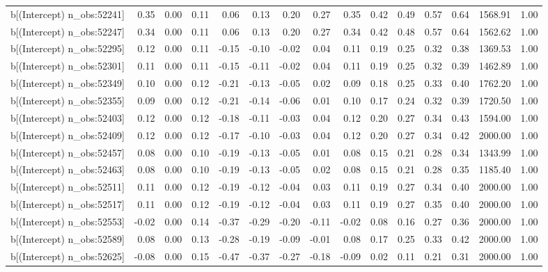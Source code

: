 \begin{table}[ht]
\begin{tabular}{rrrrrrrrrrrrrrr}
  b[(Intercept) n\_obs:52241] & 0.35 & 0.00 & 0.11 & 0.06 & 0.13 & 0.20 & 0.27 & 0.35 & 0.42 & 0.49 & 0.57 & 0.64 & 1568.91 & 1.00 \\ 
  b[(Intercept) n\_obs:52247] & 0.34 & 0.00 & 0.11 & 0.06 & 0.13 & 0.20 & 0.27 & 0.34 & 0.42 & 0.48 & 0.57 & 0.64 & 1562.62 & 1.00 \\ 
  b[(Intercept) n\_obs:52295] & 0.12 & 0.00 & 0.11 & -0.15 & -0.10 & -0.02 & 0.04 & 0.11 & 0.19 & 0.25 & 0.32 & 0.38 & 1369.53 & 1.00 \\ 
  b[(Intercept) n\_obs:52301] & 0.11 & 0.00 & 0.11 & -0.15 & -0.11 & -0.02 & 0.04 & 0.11 & 0.19 & 0.25 & 0.32 & 0.39 & 1462.89 & 1.00 \\ 
  b[(Intercept) n\_obs:52349] & 0.10 & 0.00 & 0.12 & -0.21 & -0.13 & -0.05 & 0.02 & 0.09 & 0.18 & 0.25 & 0.33 & 0.40 & 1762.20 & 1.00 \\ 
  b[(Intercept) n\_obs:52355] & 0.09 & 0.00 & 0.12 & -0.21 & -0.14 & -0.06 & 0.01 & 0.10 & 0.17 & 0.24 & 0.32 & 0.39 & 1720.50 & 1.00 \\ 
  b[(Intercept) n\_obs:52403] & 0.12 & 0.00 & 0.12 & -0.18 & -0.11 & -0.03 & 0.04 & 0.12 & 0.20 & 0.27 & 0.34 & 0.43 & 1594.00 & 1.00 \\ 
  b[(Intercept) n\_obs:52409] & 0.12 & 0.00 & 0.12 & -0.17 & -0.10 & -0.03 & 0.04 & 0.12 & 0.20 & 0.27 & 0.34 & 0.42 & 2000.00 & 1.00 \\ 
  b[(Intercept) n\_obs:52457] & 0.08 & 0.00 & 0.10 & -0.19 & -0.13 & -0.05 & 0.01 & 0.08 & 0.15 & 0.21 & 0.28 & 0.34 & 1343.99 & 1.00 \\ 
  b[(Intercept) n\_obs:52463] & 0.08 & 0.00 & 0.10 & -0.19 & -0.13 & -0.05 & 0.02 & 0.08 & 0.15 & 0.21 & 0.28 & 0.35 & 1185.40 & 1.00 \\ 
  b[(Intercept) n\_obs:52511] & 0.11 & 0.00 & 0.12 & -0.19 & -0.12 & -0.04 & 0.03 & 0.11 & 0.19 & 0.27 & 0.34 & 0.40 & 2000.00 & 1.00 \\ 
  b[(Intercept) n\_obs:52517] & 0.11 & 0.00 & 0.12 & -0.19 & -0.12 & -0.04 & 0.03 & 0.11 & 0.19 & 0.27 & 0.35 & 0.40 & 2000.00 & 1.00 \\ 
  b[(Intercept) n\_obs:52553] & -0.02 & 0.00 & 0.14 & -0.37 & -0.29 & -0.20 & -0.11 & -0.02 & 0.08 & 0.16 & 0.27 & 0.36 & 2000.00 & 1.00 \\ 
  b[(Intercept) n\_obs:52589] & 0.08 & 0.00 & 0.13 & -0.28 & -0.19 & -0.09 & -0.01 & 0.08 & 0.17 & 0.25 & 0.33 & 0.42 & 2000.00 & 1.00 \\ 
  b[(Intercept) n\_obs:52625] & -0.08 & 0.00 & 0.15 & -0.47 & -0.37 & -0.27 & -0.18 & -0.09 & 0.02 & 0.11 & 0.21 & 0.31 & 2000.00 & 1.00 \\ 

\end{tabular}
\end{table}
